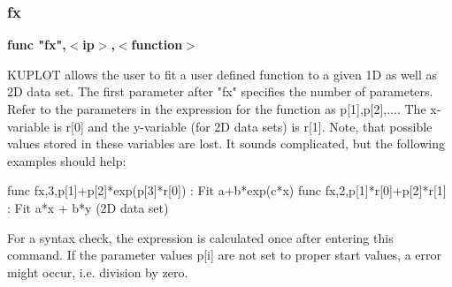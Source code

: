 \subsubsection{fx}
{\bf func "fx",$ <$ip$> $,$ <$function$> $ \par }
\vspace{3pt}
KUPLOT allows the user to fit a user defined function to a given 
1D as well as 2D data set. The first parameter after "fx" specifies 
the number of parameters. Refer to the parameters in the expression 
for the function as p[1],p[2],.... The x-variable is r[0] and the 
y-variable (for 2D data sets) is r[1]. Note, that possible values 
stored in these variables are lost. It sounds complicated, but the 
following examples should help: 
\par
\begin{MacVerbatim}
func fx,3,p[1]+p[2]*exp(p[3]*r[0])   : Fit a+b*exp(c*x)
func fx,2,p[1]*r[0]+p[2]*r[1]        : Fit a*x + b*y (2D data set)
\end{MacVerbatim}
For a syntax check, the expression is calculated once after entering 
this command. If the parameter values p[i] are not set to proper 
start values, a error might occur, i.e. division by zero. 
